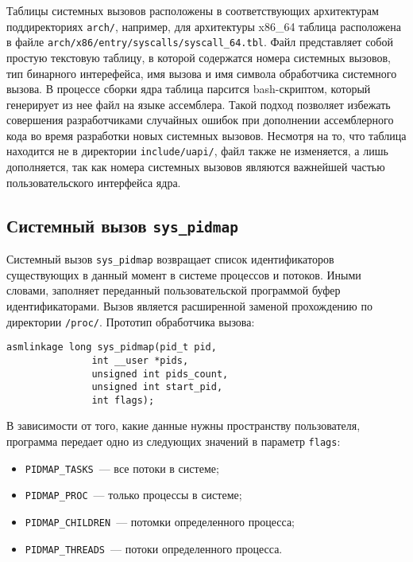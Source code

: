 Таблицы системных вызовов расположены в соответствующих архитектурам
поддиректориях \texttt{arch/}, например, для архитектуры x86\_64 таблица
расположена в файле \texttt{arch/x86/entry/syscalls/syscall\_64.tbl}.
Файл представляет собой простую текстовую таблицу, в которой содержатся
номера системных вызовов, тип бинарного интерефейса, имя вызова и имя символа
обработчика системного вызова. В процессе сборки ядра таблица парсится
bash-скриптом, который генерирует из нее файл на языке ассемблера. Такой подход
позволяет избежать совершения разработчиками случайных ошибок при дополнении
ассемблерного кода во время разработки новых системных вызовов. Несмотря на то,
что таблица находится не в директории \texttt{include/uapi/}, файл также не
изменяется, а лишь дополняется, так как номера системных вызовов являются
важнейшей частью пользовательского интерфейса ядра.

\subsection{Системный вызов \texttt{sys\_pidmap}}

Системный вызов \texttt{sys\_pidmap} возвращает список идентификаторов
существующих в данный момент в системе процессов и потоков. Иными словами,
заполняет переданный пользовательской программой буфер идентификаторами. Вызов
является расширенной заменой прохождению по директории \texttt{/proc/}. Прототип
обработчика вызова:

\medskip
\begin{lstlisting}[style=cstyle]
asmlinkage long sys_pidmap(pid_t pid,
			   int __user *pids,
			   unsigned int pids_count,
			   unsigned int start_pid,
			   int flags);
\end{lstlisting}
\medskip

В зависимости от того, какие данные нужны пространству пользователя, программа
передает одно из следующих значений в параметр \texttt{flags}:

\begin{itemize}
\item \texttt{PIDMAP\_TASKS}~--- все потоки в системе;
\item \texttt{PIDMAP\_PROC}~--- только процессы в системе;
\item \texttt{PIDMAP\_CHILDREN}~--- потомки определенного процесса;
\item \texttt{PIDMAP\_THREADS}~--- потоки определенного процесса.
\end{itemize}

